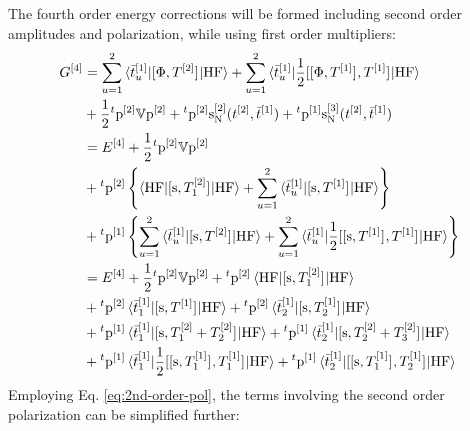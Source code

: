 The fourth order energy corrections will be formed including second
order amplitudes and polarization, while using first order multipliers:
\begin{equation}\label{eq:fourth-order-G}
  \begin{aligned}
    G^{[4]} &=
    \sum_{u=1}^2\braket{\bar{t}_{u}^{[1]} | [ \Phi, T^{[2]} ]^{} | \mathrm{HF}}
    +
    \sum_{u=1}^2\braket{\bar{t}_{u}^{[1]} |
    \frac{1}{2}[ [ \Phi, T^{[1]} ]^{}, T^{[1]} ]^{} | \mathrm{HF}}
    \\
    &+\frac{1}{2}{}^t\mathrm{p}^{[2]}\mathbb{V}\mathrm{p}^{[2]}
    + {}^t\mathrm{p}^{[2]}\mathrm{s}_{\mathrm{N}}^{[2]}(t_{}^{[2]}, \bar{t}_{}^{[1]})
    + {}^t\mathrm{p}^{[1]}\mathrm{s}_{\mathrm{N}}^{[3]}(t_{}^{[2]}, \bar{t}_{}^{[1]}) \\
    &= E^{[4]}
    + \frac{1}{2}{}^t\mathrm{p}^{[2]}\mathbb{V}\mathrm{p}^{[2]} \\
    &+{}^t\mathrm{p}^{[2]}
    \left\lbrace
    \braket{\mathrm{HF} | [ \mathrm{s}, T_1^{[2]} ]^{} | \mathrm{HF}}
    +
    \sum_{u=1}^2\braket{\bar{t}_{u}^{[1]}|
    [ \mathrm{s}, T^{[1]} ]^{} | \mathrm{HF} }
    \right\rbrace \\
    &+{}^t\mathrm{p}^{[1]}
    \left\lbrace
    \sum_{u=1}^2\braket{\bar{t}_{u}^{[1]}|
    [ \mathrm{s}, T^{[2]} ]^{} | \mathrm{HF}}
    +
    \sum_{u=1}^2\braket{\bar{t}_{u}^{[1]}|
    \frac{1}{2}
    [ [ \mathrm{s}, T^{[1]} ]^{}, T^{[1]} ]^{}
    |
    \mathrm{HF}}
    \right\rbrace \\
  &= E^{[4]}
    + \frac{1}{2}{}^t\mathrm{p}^{[2]}\mathbb{V}\mathrm{p}^{[2]}
    + {}^t\mathrm{p}^{[2]}
      \braket{\mathrm{HF} | [ \mathrm{s}, T_1^{[2]} ]^{} | \mathrm{HF}} \\
    &+ {}^t\mathrm{p}^{[2]}
      \braket{\bar{t}_{1}^{[1]}| [ \mathrm{s}, T^{[1]} ]^{} | \mathrm{HF} }
    + {}^t\mathrm{p}^{[2]}
       \braket{\bar{t}_{2}^{[1]}| [ \mathrm{s}, T_2^{[1]} ]^{} | \mathrm{HF} } \\
    &+
    {}^t\mathrm{p}^{[1]}
    \braket{\bar{t}_{1}^{[1]} | [ \mathrm{s}, T_1^{[2]} + T_2^{[2]} ]^{} | \mathrm{HF}}
    +
    {}^t\mathrm{p}^{[1]}
    \braket{\bar{t}_{2}^{[1]} | [ \mathrm{s}, T_2^{[2]} + T_3^{[2]} ]^{} | \mathrm{HF}}
    \\
    &+
    {}^t\mathrm{p}^{[1]}
    \braket{\bar{t}_{1}^{[1]} |
    \frac{1}{2}[ [ \mathrm{s}, T_1^{[1]} ]^{}, T_1^{[1]} ]^{}
    |
    \mathrm{HF}}
    +
    {}^t\mathrm{p}^{[1]}
    \braket{\bar{t}_{2}^{[1]} |
    [ [ \mathrm{s}, T_1^{[1]} ]^{}, T_2^{[1]} ]^{}
    |
    \mathrm{HF}}
  \end{aligned}
\end{equation}
Employing Eq. \eqref{eq:2nd-order-pol}, the terms involving the
second order polarization can be simplified further:
